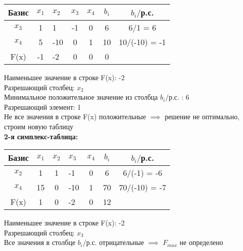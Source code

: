 \begin{center}
    \begin{tabular}{|c | c g c c c c|} 
         \hline
            Базис & $x_1$ & $x_2$ & $x_3$ & $x_4$ & $b_i$ & $b_i/$р.с.\\
         \hline
            $x_3$ & 1 & 1 & -1 & 0 & 6 & 6/1 = 6\\
         \hline
            $x_4$ & 5 & -10 & 0 & 1 & 10 & 10/(-10) = -1\\
         \hline
            F(x) & -1 & -2 & 0 & 0 & 0 &\\
         \hline
    \end{tabular}
\end{center}

\begin{flushleft}
    Наименьшее значение в строке F(x): -2\\
    Разрешающий столбец: $x_2$\\
    Минимальное положительное значение из столбца $b_i$/р.с. : 6\\
    Разрешающий элемент: 1\\
    Не все значения в строке F(x) положительные $\implies$ решение не оптимально, строим новую таблицу\\
    {\bf2-я симплекс-таблица:}\\
\end{flushleft}

\begin{center}
    \begin{tabular}{|c | c c g c c c|} 
         \hline
            Базис & $x_1$ & $x_2$ & $x_3$ & $x_4$ & $b_i$ & $b_i/$р.с.\\
         \hline
            $x_2$ & 1 & 1 & -1 & 0 & 6 & 6/(-1) = -6\\
         \hline
            $x_4$ & 15 & 0 & -10 & 1 & 70 & 70/(-10) = -7\\
         \hline
            F(x) & 1 & 0 & -2 & 0 & 12 &\\
         \hline
    \end{tabular}
\end{center}

\begin{flushleft}
    Наименьшее значение в строке F(x): -2\\
    Разрешающий столбец: $x_3$\\
    Все значения в столбце $b_i$/р.с. отрицательные $\implies$ $F_{max}$ не определено
\end{flushleft}


